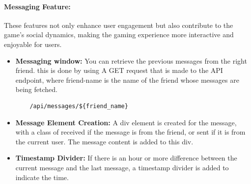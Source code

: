 \documentclass[12pt]{article}
\begin{document}
\paragraph{Messaging Feature:}
These features not only enhance user engagement but also contribute to the game's social dynamics, making the gaming experience more interactive and enjoyable for users.
\begin{itemize}
    \item \textbf{Messaging window:} You can retrieve the previous messages from the right friend. this is done by using  A GET request that is made to the API endpoint, where friend-name is the name of the friend whose messages are being fetched.
    \begin{verbatim}
    /api/messages/${friend_name}
    \end{verbatim}
    \item \textbf{Message Element Creation:} A div element is created for the message, with a class of received if the message is from the friend, or sent if it is from the current user. The message content is added to this div.
    \item \textbf{Timestamp Divider:}  If there is an hour or more difference between the current message and the last message, a timestamp divider is added to indicate the time.
\end{itemize}
\end{document}
